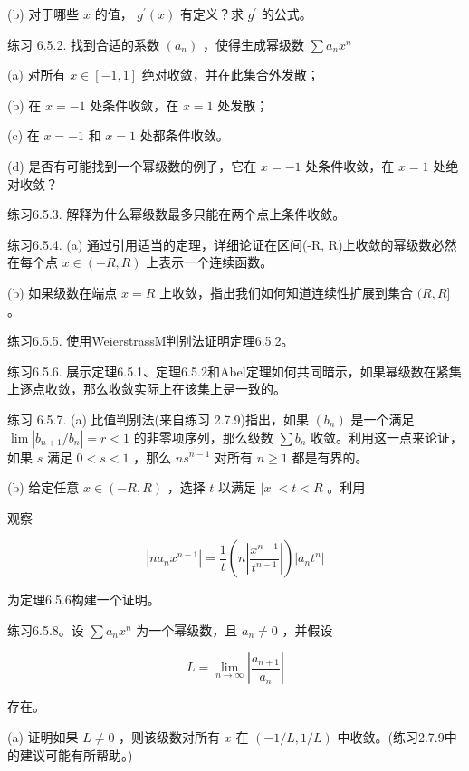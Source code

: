 (b) 对于哪些 \(x\) 的值， \({g}^{\prime }\left( x\right)\) 有定义？求 \({g}^{\prime }\) 的公式。

练习 6.5.2. 找到合适的系数 \(\left( {a}_{n}\right)\) ，使得生成幂级数 \(\sum {a}_{n}{x}^{n}\)

(a) 对所有 \(x \in  \left\lbrack  {-1,1}\right\rbrack\) 绝对收敛，并在此集合外发散；

(b) 在 \(x =  - 1\) 处条件收敛，在 \(x = 1\) 处发散；

(c) 在 \(x =  - 1\) 和 \(x = 1\) 处都条件收敛。

(d) 是否有可能找到一个幂级数的例子，它在 \(x =  - 1\) 处条件收敛，在 \(x = 1\) 处绝对收敛？

练习6.5.3. 解释为什么幂级数最多只能在两个点上条件收敛。

练习6.5.4. (a) 通过引用适当的定理，详细论证在区间(-R, R)上收敛的幂级数必然在每个点 \(x \in  \left( {-R,R}\right)\) 上表示一个连续函数。

(b) 如果级数在端点 \(x = R\) 上收敛，指出我们如何知道连续性扩展到集合 \((R,R\rbrack\) 。

练习6.5.5. 使用WeierstrassM判别法证明定理6.5.2。

练习6.5.6. 展示定理6.5.1、定理6.5.2和Abel定理如何共同暗示，如果幂级数在紧集上逐点收敛，那么收敛实际上在该集上是一致的。

练习 6.5.7. (a) 比值判别法(来自练习 2.7.9)指出，如果 \(\left( {b}_{n}\right)\) 是一个满足 \(\lim \left| {{b}_{n + 1}/{b}_{n}}\right|  = r < 1\) 的非零项序列，那么级数 \(\sum {b}_{n}\) 收敛。利用这一点来论证，如果 \(s\) 满足 \(0 < s < 1\) ，那么 \(n{s}^{n - 1}\) 对所有 \(n \geq  1\) 都是有界的。

(b) 给定任意 \(x \in  \left( {-R,R}\right)\) ，选择 \(t\) 以满足 \(\left| x\right|  < t < R\) 。利用

观察

\[
\left| {n{a}_{n}{x}^{n - 1}}\right|  = \frac{1}{t}\left( {n\left| \frac{{x}^{n - 1}}{{t}^{n - 1}}\right| }\right) \left| {{a}_{n}{t}^{n}}\right|
\]

为定理6.5.6构建一个证明。

练习6.5.8。设 \(\sum {a}_{n}{x}^{n}\) 为一个幂级数，且 \({a}_{n} \neq  0\) ，并假设

\[
L = \mathop{\lim }\limits_{{n \rightarrow  \infty }}\left| \frac{{a}_{n + 1}}{{a}_{n}}\right|
\]

存在。

(a) 证明如果 \(L \neq  0\) ，则该级数对所有 \(x\) 在 \(\left( {-1/L,1/L}\right)\) 中收敛。(练习2.7.9中的建议可能有所帮助。)

